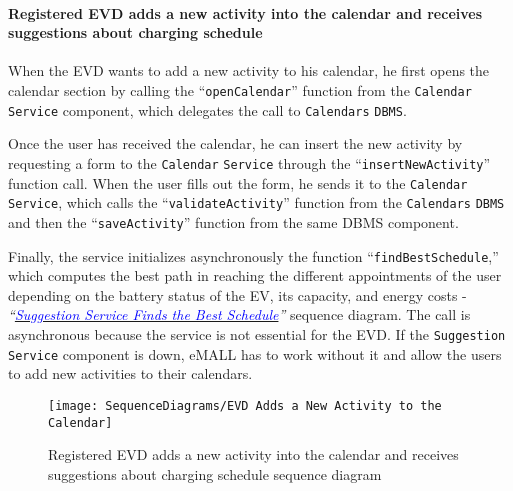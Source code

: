\paragraph{Registered EVD adds a new activity into the calendar and receives suggestions about charging schedule}
When the EVD wants to add a new activity to his calendar, he first opens the calendar section by calling the ``\verb|openCalendar|'' function from the \verb|Calendar| \verb|Service| component, which delegates the call to \verb|Calendars| \verb|DBMS|\@.

Once the user has received the calendar, he can insert the new activity by requesting a form to the \verb|Calendar| \verb|Service| through the ``\verb|insertNewActivity|'' function call.
When the user fills out the form, he sends it to the \verb|Calendar| \verb|Service|, which calls the ``\verb|validateActivity|'' function from the \verb|Calendars| \verb|DBMS| and then the ``\verb|saveActivity|'' function from the same DBMS component.

Finally, the service initializes asynchronously the function ``\verb|findBestSchedule|,'' which computes the best path in reaching the different appointments of the user depending on the battery status of the EV, its capacity, and energy costs - \textit{``}\hyperlink{suggestionfindsschedule}{\textcolor{blue}{\textit{Suggestion Service Finds the Best Schedule}}}\textit{''} sequence diagram.
The call is asynchronous because the service is not essential for the EVD\@.
If the \verb|Suggestion| \verb|Service| component is down, eMALL has to work without it and allow the users to add new activities to their calendars.
\begin{figure}[H]
    \begin{center}
        \texttt{[image: SequenceDiagrams/EVD Adds a New Activity to the Calendar]}
        \caption{Registered EVD adds a new activity into the calendar and receives suggestions about charging schedule sequence diagram}
        \label{fig:evd_adds_new_activity_calendar}
    \end{center}
\end{figure}

